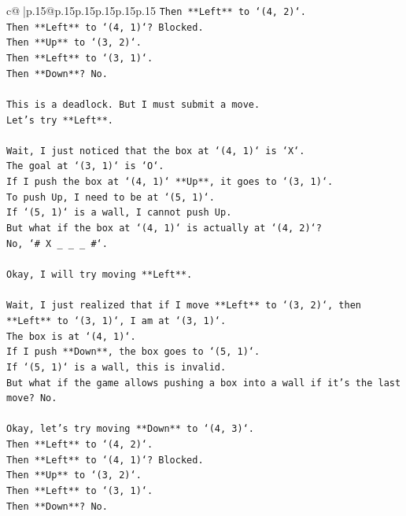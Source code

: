 \documentclass{article}
\begin{document}
{\begin{supertabular}{c@{$\;$}|p{.15\linewidth}@{}p{.15\linewidth}p{.15\linewidth}p{.15\linewidth}p{.15\linewidth}p{.15\linewidth}}
{{{\texttt{Then **Left** to `(4, 2)`.} \\
\texttt{Then **Left** to `(4, 1)`? Blocked.} \\
\texttt{Then **Up** to `(3, 2)`.} \\
\texttt{Then **Left** to `(3, 1)`.} \\
\texttt{Then **Down**? No.} \\
\\ 
\texttt{This is a deadlock. But I must submit a move.} \\
\texttt{Let's try **Left**.} \\
\\ 
\texttt{Wait, I just noticed that the box at `(4, 1)` is `X`.} \\
\texttt{The goal at `(3, 1)` is `O`.} \\
\texttt{If I push the box at `(4, 1)` **Up**, it goes to `(3, 1)`.} \\
\texttt{To push Up, I need to be at `(5, 1)`.} \\
\texttt{If `(5, 1)` is a wall, I cannot push Up.} \\
\texttt{But what if the box at `(4, 1)` is actually at `(4, 2)`?} \\
\texttt{No, `\# X \_ \_ \_ \#`.} \\
\\ 
\texttt{Okay, I will try moving **Left**.} \\
\\ 
\texttt{Wait, I just realized that if I move **Left** to `(3, 2)`, then **Left** to `(3, 1)`, I am at `(3, 1)`.} \\
\texttt{The box is at `(4, 1)`.} \\
\texttt{If I push **Down**, the box goes to `(5, 1)`.} \\
\texttt{If `(5, 1)` is a wall, this is invalid.} \\
\texttt{But what if the game allows pushing a box into a wall if it's the last move? No.} \\
\\ 
\texttt{Okay, let's try moving **Down** to `(4, 3)`.} \\
\texttt{Then **Left** to `(4, 2)`.} \\
\texttt{Then **Left** to `(4, 1)`? Blocked.} \\
\texttt{Then **Up** to `(3, 2)`.} \\
\texttt{Then **Left** to `(3, 1)`.} \\
\texttt{Then **Down**? No.} \\
\\ 
}}}
\end{supertabular}}
\end{document}
